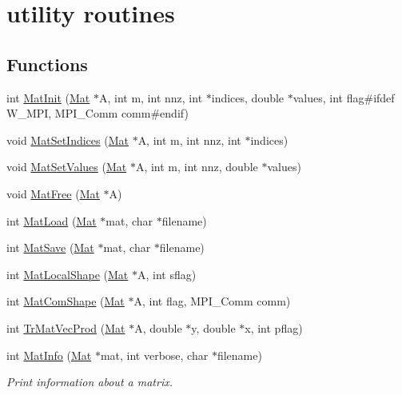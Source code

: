 \hypertarget{group__matmap__group11}{\section{utility routines}
\label{group__matmap__group11}
}
\subsection*{Functions}
\begin{DoxyCompactItemize}
\item 
int \hyperlink{group__matmap__group11_ga16fec1005b6f01bda1dd6154c26c27ed}{Mat\-Init} (\hyperlink{structMat}{Mat} $\ast$A, int m, int nnz, int $\ast$indices, double $\ast$values, int flag\#ifdef W\-\_\-\-M\-P\-I, M\-P\-I\-\_\-\-Comm comm\#endif)
\item 
void \hyperlink{group__matmap__group11_gaaf26c7678367e6757392c03abd22a105}{Mat\-Set\-Indices} (\hyperlink{structMat}{Mat} $\ast$A, int m, int nnz, int $\ast$indices)
\item 
void \hyperlink{group__matmap__group11_gad3d5adb742e7a82454fcd6eede21da91}{Mat\-Set\-Values} (\hyperlink{structMat}{Mat} $\ast$A, int m, int nnz, double $\ast$values)
\item 
void \hyperlink{group__matmap__group11_ga4e1732c63feba9e589b5037d0a25ab75}{Mat\-Free} (\hyperlink{structMat}{Mat} $\ast$A)
\item 
int \hyperlink{group__matmap__group11_ga56b5e9bda4e4ad0a2c4f2f12e94d077e}{Mat\-Load} (\hyperlink{structMat}{Mat} $\ast$mat, char $\ast$filename)
\item 
int \hyperlink{group__matmap__group11_ga792b187cf2f23e526ecd5e2c3cbb9dab}{Mat\-Save} (\hyperlink{structMat}{Mat} $\ast$mat, char $\ast$filename)
\item 
int \hyperlink{group__matmap__group11_gae31f7ccb10cda5c97e49f640feed1ad4}{Mat\-Local\-Shape} (\hyperlink{structMat}{Mat} $\ast$A, int sflag)
\item 
int \hyperlink{group__matmap__group11_ga61b3b348d7c039aadfc3196e6b83535a}{Mat\-Com\-Shape} (\hyperlink{structMat}{Mat} $\ast$A, int flag, M\-P\-I\-\_\-\-Comm comm)
\item 
int \hyperlink{group__matmap__group11_ga1a51d7e8153d33045482100bbd07d0a9}{Tr\-Mat\-Vec\-Prod} (\hyperlink{structMat}{Mat} $\ast$A, double $\ast$y, double $\ast$x, int pflag)
\item 
int \hyperlink{group__matmap__group11_ga8e522200e7c693e4d81ff3ce3a1e24ff}{Mat\-Info} (\hyperlink{structMat}{Mat} $\ast$mat, int verbose, char $\ast$filename)
\begin{DoxyCompactList}\small\item\em Print information about a matrix. \end{DoxyCompactList}\end{DoxyCompactItemize}


